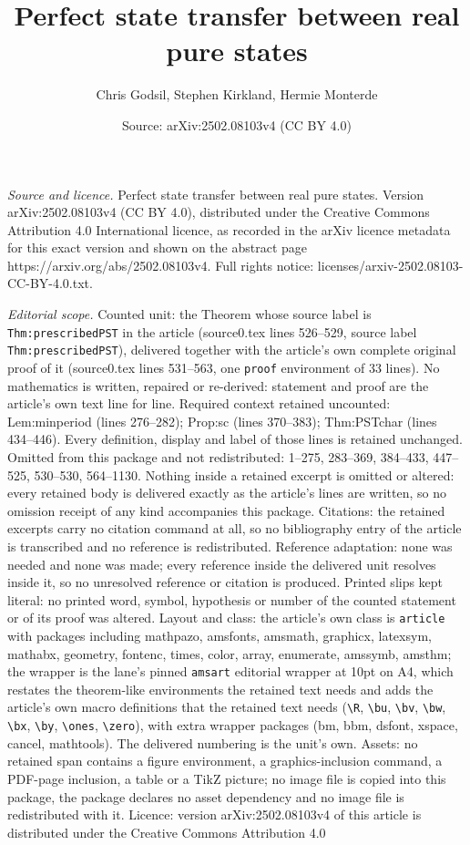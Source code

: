 \documentclass[10pt,a4paper]{amsart}
\title[Perfect state transfer between real pure states]{Perfect state transfer between real pure states}
\author{Chris Godsil, Stephen Kirkland, Hermie Monterde}
\date{Source: arXiv:2502.08103v4 (CC BY 4.0)}
\begin{document}
\maketitle

\noindent\emph{Source and licence.} Perfect state transfer between real pure states. Version arXiv:2502.08103v4 (CC BY 4.0), distributed under the Creative Commons Attribution 4.0 International licence, as recorded in the arXiv licence metadata for this exact version and shown on the abstract page https://arxiv.org/abs/2502.08103v4. Full rights notice: licenses/arxiv-2502.08103-CC-BY-4.0.txt.\par\smallskip

\noindent\textit{Editorial scope.} Counted unit: the Theorem whose source label is \texttt{Thm:prescribedPST} in the article (source0.tex lines 526--529, source label \texttt{Thm:prescribedPST}), delivered together with the article's own complete original proof of it (source0.tex lines 531--563, one \texttt{proof} environment of 33 lines). No mathematics is written, repaired or re-derived: statement and proof are the article's own text line for line. Required context retained uncounted: Lem:minperiod (lines 276--282); Prop:sc (lines 370--383); Thm:PSTchar (lines 434--446). Every definition, display and label of those lines is retained unchanged. Omitted from this package and not redistributed: 1--275, 283--369, 384--433, 447--525, 530--530, 564--1130. Nothing inside a retained excerpt is omitted or altered: every retained body is delivered exactly as the article's lines are written, so no omission receipt of any kind accompanies this package. Citations: the retained excerpts carry no citation command at all, so no bibliography entry of the article is transcribed and no reference is redistributed. Reference adaptation: none was needed and none was made; every reference inside the delivered unit resolves inside it, so no unresolved reference or citation is produced. Printed slips kept literal: no printed word, symbol, hypothesis or number of the counted statement or of its proof was altered. Layout and class: the article's own class is \texttt{article} with packages including mathpazo, amsfonts, amsmath, graphicx, latexsym, mathabx, geometry, fontenc, times, color, array, enumerate, amssymb, amsthm; the wrapper is the lane's pinned \texttt{amsart} editorial wrapper at 10pt on A4, which restates the theorem-like environments the retained text needs and adds the article's own macro definitions that the retained text needs (\texttt{\textbackslash R}, \texttt{\textbackslash bu}, \texttt{\textbackslash bv}, \texttt{\textbackslash bw}, \texttt{\textbackslash bx}, \texttt{\textbackslash by}, \texttt{\textbackslash ones}, \texttt{\textbackslash zero}), with extra wrapper packages (bm, bbm, dsfont, xspace, cancel, mathtools). The delivered numbering is the unit's own. Assets: no retained span contains a figure environment, a graphics-inclusion command, a PDF-page inclusion, a table or a TikZ picture; no image file is copied into this package, the package declares no asset dependency and no image file is redistributed with it. Licence: version arXiv:2502.08103v4 of this article is distributed under the Creative Commons Attribution 4.0 
\end{document}
